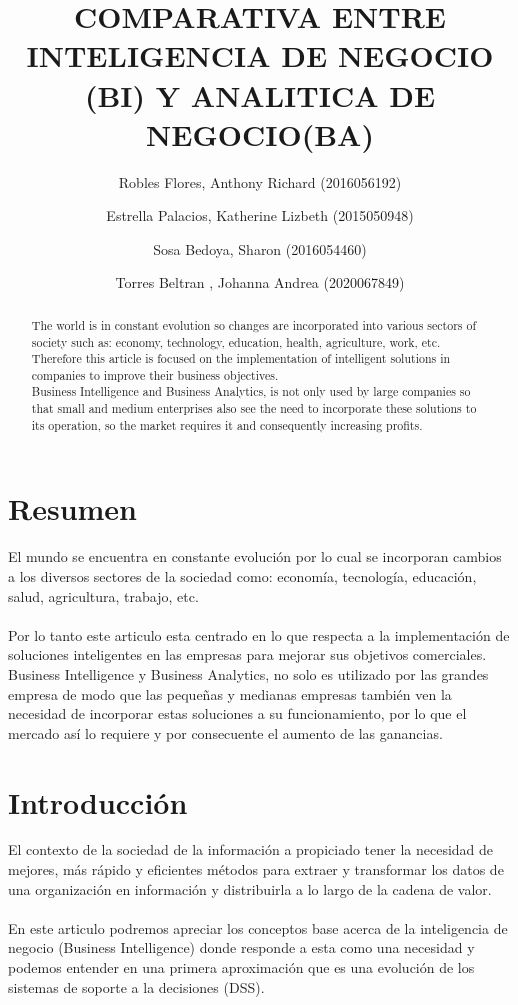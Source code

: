 \documentclass[preprint,12pt]{elsarticle}
\begin{document}
	
	\begin{frontmatter}

		\title{\huge  COMPARATIVA ENTRE INTELIGENCIA DE NEGOCIO (BI) Y ANALITICA DE NEGOCIO(BA) }
		\author{Robles Flores, Anthony Richard	                (2016056192)}
		\author{Estrella Palacios, Katherine Lizbeth			(2015050948)}
		\author{Sosa Bedoya, Sharon					(2016054460)}
		\author{Torres Beltran , Johanna Andrea			(2020067849)}
		\address{Tacna, Perú}
		


\begin{abstract}
The world is in constant evolution so changes are incorporated into various sectors of society such as: economy, technology, education, health, agriculture, work, etc. 
Therefore this article is focused on the implementation of intelligent solutions in companies to improve their business objectives. 
\\
Business Intelligence and Business Analytics, is not only used by large companies so that small and medium enterprises also see the need to incorporate these solutions to its operation, so the market requires it and consequently increasing profits.
\end{abstract}


\end{frontmatter}

\section{Resumen}
El mundo se encuentra en constante evolución por lo cual se incorporan cambios a los diversos sectores de la sociedad como: economía, tecnología, educación, salud, agricultura, trabajo, etc. 
\\
\\
Por lo tanto este articulo esta centrado en lo que respecta a la implementación de soluciones inteligentes en las empresas para mejorar sus objetivos comerciales. 
Business Intelligence y Business Analytics,  no solo es utilizado por las grandes empresa de modo que las pequeñas y medianas empresas también ven la necesidad de incorporar estas soluciones a su funcionamiento, por lo que el mercado así lo requiere y por consecuente el aumento de las ganancias.


\section{Introducción}
El contexto de la sociedad de la información a propiciado tener la necesidad de mejores, más rápido y eficientes 
métodos para extraer y transformar los datos de una organización en información y distribuirla a lo largo de la 
cadena de valor.
\\
\\
En este articulo podremos apreciar los conceptos base acerca de la inteligencia de negocio (Business Intelligence)
 donde responde a esta como una necesidad y podemos entender en una primera aproximación que es una 
evolución de los sistemas de soporte a la decisiones (DSS).
\\
\end{document}
